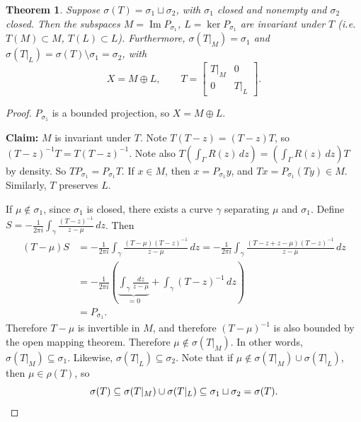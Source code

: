 \documentclass[12pt]{article}
\renewcommand{\Im}{\operatorname{Im}}
\newtheorem{thm}{Theorem}[section]
\theoremstyle{definition}
\begin{document}
\begin{thm}
	Suppose $\sigma(T) = \sigma_1 \sqcup \sigma_2$, with $\sigma_1$ closed and nonempty and $\sigma_2$ closed.
	Then the subspaces $M = \Im P_{\sigma_1}$, $L = \ker P_{\sigma_1}$ are invariant under $T$ (i.e.\ $T(M) \subset M$, $T(L) \subset L$).
	Furthermore, $\sigma(T|_M) = \sigma_1$ and $\sigma(T|_L) = \sigma(T) \setminus \sigma_1 = \sigma_2$, with
	\begin{equation*}
		X = M \oplus L, \qquad T = \begin{bmatrix} T|_M & 0 \\ 0 & T|_L \end{bmatrix}.
	\end{equation*}
\end{thm}
\begin{proof}
	$P_{\sigma_1}$ is a bounded projection, so $X = M \oplus L$.

	\textbf{Claim: } $M$ is invariant under $T$.
	Note $T(T-z) = (T-z)T$, so $(T-z)^{-1} T = T (T-z)^{-1}$.
	Note also $T \left( \int_\Gamma R(z) \, dz \right) = \left( \int_\Gamma R(z) \, dz \right) T$ by density.
	So $T P_{\sigma_1} = P_{\sigma_1} T$.
	If $x \in M$, then $x = P_{\sigma_1} y$, and $Tx = P_{\sigma_1}(Ty) \in M$.
	Similarly, $T$ preserves $L$.

	If $\mu \notin \sigma_1$, since $\sigma_1$ is closed, there exists a curve $\gamma$ separating $\mu$ and $\sigma_1$.
	Define $S = -\frac{1}{2\pi i} \int_\gamma \frac{(T-z)^{-1}}{z - \mu} \, dz$.
	Then
	\begin{align*}
		(T-\mu)S &= -\frac{1}{2\pi i} \int_\gamma \frac{(T-\mu)(T-z)^{-1}}{z-\mu} \, dz = -\frac{1}{2\pi i} \int_\gamma \frac{(T - z + z - \mu)(T-z)^{-1}}{z - \mu} \, dz \\
		&= -\frac{1}{2\pi i} \left( \underbrace{\int_\gamma \frac{dz}{z-\mu}}_{=0} + \int_\gamma (T-z)^{-1} \, dz \right) \\
		&= P_{\sigma_1}.
	\end{align*}
	Therefore $T - \mu$ is invertible in $M$, and therefore $(T-\mu)^{-1}$ is also bounded by the open mapping theorem.
	Therefore $\mu \notin \sigma(T|_M)$.
	In other words, $\sigma(T|_M) \subseteq \sigma_1$.
	Likewise, $\sigma(T|_L) \subseteq \sigma_2$.
	Note that if $\mu \notin \sigma(T|_M) \cup \sigma(T|_L)$, then $\mu \in \rho(T)$, so
	\begin{equation*}
		\sigma(T) \subseteq \sigma(T|_M) \cup \sigma(T|_L) \subseteq \sigma_1 \sqcup \sigma_2 = \sigma(T). \qedhere
	\end{equation*}
\end{proof}
\end{document}
